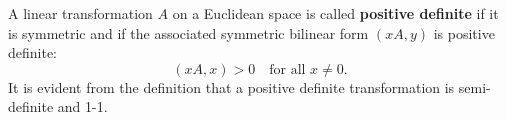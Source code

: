 A linear transformation $A$ on a Euclidean space is called \textbf{positive definite} if it is symmetric and if the associated symmetric bilinear form $(xA, y)$ is positive definite:
$$(xA, x) > 0 \quad \text{for all } x \neq 0.$$
It is evident from the definition that a positive definite transformation is semi-definite and 1-1.
